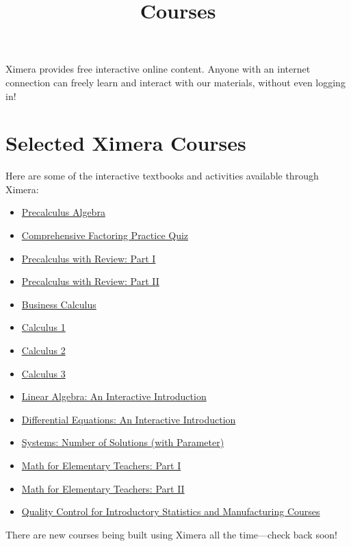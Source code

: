 \documentclass{ximera}
\title{Courses}
\begin{document}
\begin{abstract}
\end{abstract}
\maketitle

Ximera provides free interactive online content. Anyone with an internet
connection can freely learn and interact with our materials, without
even logging in!

\section*{Selected Ximera Courses}

Here are some of the interactive textbooks and activities available
through Ximera:

\begin{itemize}
  \item \href{https://go.osu.edu/prca}{Precalculus Algebra}
  \item \href{https://go.osu.edu/cfa}{Comprehensive Factoring Practice Quiz}
  \item \href{https://go.osu.edu/pcr}{Precalculus with Review: Part I}
  \item \href{https://go.osu.edu/pcr2}{Precalculus with Review: Part II}
  \item \href{https://go.osu.edu/bca}{Business Calculus}
  \item \href{https://go.osu.edu/mc1}{Calculus 1}
  \item \href{https://go.osu.edu/mc2}{Calculus 2}
  \item \href{https://go.osu.edu/mc3}{Calculus 3}
  \item \href{https://go.osu.edu/ila}{Linear Algebra: An Interactive Introduction}
  \item \href{https://go.osu.edu/idiffeq}{Differential Equations: An Interactive Introduction}
  \item \href{https://go.osu.edu/mepr}{Systems: Number of Solutions (with Parameter)}
  \item \href{https://go.osu.edu/met1}{Math for Elementary Teachers: Part I}
  \item \href{https://go.osu.edu/met2}{Math for Elementary Teachers: Part II}
  \item \href{https://go.osu.edu/qcst}{Quality Control for Introductory Statistics and Manufacturing Courses}
\end{itemize}

There are new courses being built using Ximera all the time---check back soon!
\end{document}
